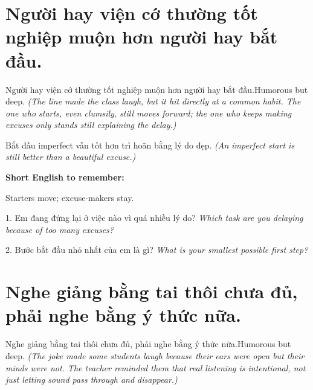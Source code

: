 \section{Người hay viện cớ thường tốt nghiệp muộn hơn người hay bắt đầu.}
\begin{truyen}{Người hay viện cớ thường tốt nghiệp muộn hơn người hay bắt đầu.}{Humorous but deep.}
\textit{(The line made the class laugh, but it hit directly at a common habit. The one who starts, even clumsily, still moves forward; the one who keeps making excuses only stands still explaining the delay.)}
\end{truyen}

\begin{baihoc}
Bắt đầu imperfect vẫn tốt hơn trì hoãn bằng lý do đẹp.
\textit{(An imperfect start is still better than a beautiful excuse.)}
\end{baihoc}

\begin{ghinhoanh}
\textbf{Short English to remember:}

Starters move; excuse-makers stay.

\end{ghinhoanh}

\begin{tuhocnhanh}
1. Em đang đứng lại ở việc nào vì quá nhiều lý do? \textit{Which task are you delaying because of too many excuses?}

2. Bước bắt đầu nhỏ nhất của em là gì? \textit{What is your smallest possible first step?}
\end{tuhocnhanh}
\ngancach

\section{Nghe giảng bằng tai thôi chưa đủ, phải nghe bằng ý thức nữa.}
\begin{truyen}{Nghe giảng bằng tai thôi chưa đủ, phải nghe bằng ý thức nữa.}{Humorous but deep.}
\textit{(The joke made some students laugh because their ears were open but their minds were not. The teacher reminded them that real listening is intentional, not just letting sound pass through and disappear.)}
\end{truyen}

